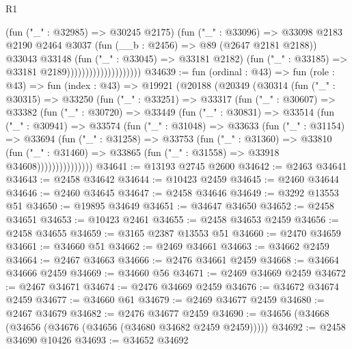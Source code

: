 \begin{lexlean}{R1}
\begin{coremodule}
                                        (fun ("_" : @32985) => @30245 @2175)
                                        (fun ("_" : @33096) =>
                                        @33098
                                          @2183
                                          @2190
                                          @2464
                                          @3037
                                          (fun (__b : @2456) => @89 (@2647 @2181 @2188))
                                          @33043
                                          @33148
                                          (fun ("_" : @33045) => @33181 @2182)
                                          (fun ("_" : @33185) => @33181 @2189))))))))))))))))))))
@34639 := fun (ordinal : @43) =>
  fun (role : @43) =>
  fun (index : @43) =>
  @19921
    (@20188
      (@20349
        (@30314
          (fun ("_" : @30315) =>
          @33250
            (fun ("_" : @33251) =>
            @33317
              (fun ("_" : @30607) =>
              @33382
                (fun ("_" : @30720) =>
                @33449
                  (fun ("_" : @30831) =>
                  @33514
                    (fun ("_" : @30941) =>
                    @33574
                      (fun ("_" : @31048) =>
                      @33633
                        (fun ("_" : @31154) =>
                        @33694
                          (fun ("_" : @31258) =>
                          @33753
                            (fun ("_" : @31360) =>
                            @33810
                              (fun ("_" : @31460) =>
                              @33865 (fun ("_" : @31558) => @33918 @34608)))))))))))))))
@34641 := @13193 @2745 @2600
@34642 := @2463 @34641
@34643 := @2458 @34642
@34644 := @10423 @2459
@34645 := @2460 @34644
@34646 := @2460 @34645
@34647 := @2458 @34646
@34649 := @3292 @13553 @51
@34650 := @19895 @34649
@34651 := @34647 @34650
@34652 := @2458 @34651
@34653 := @10423 @2461
@34655 := @2458 @34653 @2459
@34656 := @2458 @34655
@34659 := @3165 @2387 @13553 @51
@34660 := @2470 @34659
@34661 := @34660 @51
@34662 := @2469 @34661
@34663 := @34662 @2459
@34664 := @2467 @34663
@34666 := @2476 @34661 @2459
@34668 := @34664 @34666 @2459
@34669 := @34660 @56
@34671 := @2469 @34669 @2459
@34672 := @2467 @34671
@34674 := @2476 @34669 @2459
@34676 := @34672 @34674 @2459
@34677 := @34660 @61
@34679 := @2469 @34677 @2459
@34680 := @2467 @34679
@34682 := @2476 @34677 @2459
@34690 := @34656 (@34668 (@34656 (@34676 (@34656 (@34680 @34682 @2459 @2459)))))
@34692 := @2458 @34690 @10426
@34693 := @34652 @34692

\end{coremodule}
\end{lexlean}
